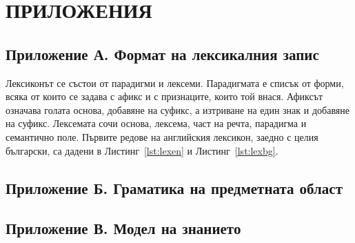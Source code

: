 {}
\section*{ПРИЛОЖЕНИЯ}
\label{sec:appendix}

\subsection*{Приложение А. Формат на лексикалния запис}

Лексиконът се състои от парадигми и лексеми. Парадигмата е списък от форми, всяка от
които се задава с афикс и с признаците, които той внася. Афиксът \code{+} означава голата
основа,  добавяне на суфикс, а  изтриване на един
знак и добавяне на суфикс. Лексемата сочи основа, лексема, част на речта, парадигма и
семантично поле. Първите редове на английския лексикон, заедно с целия български, са
дадени в Листинг~\ref{lst:lexen} и Листинг~\ref{lst:lexbg}.





\subsection*{Приложение Б. Граматика на предметната област}



\subsection*{Приложение В. Модел на знанието}

